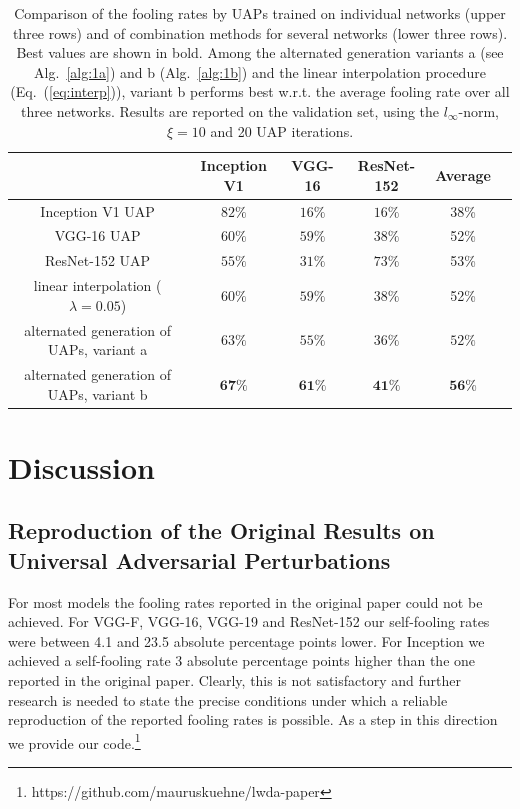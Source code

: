 \documentclass[runningheads]{llncs}
\begin{document}
\begin{table}
\centering

\begin{tabular}{|c|c|c|c|c|c|}
\hline
											&	Inception	V1&	VGG-16		&	ResNet-152	& Average	\\ \hline
Inception V1 UAP							&	\(82\%\)		&	\(16\%\)	&	\(16\%\)	&38\%	\\
VGG-16 UAP								&	\(60\%\)		&	\(59\%\)	&	\(38\%\)	&52\%	\\
ResNet-152 UAP &	\(55\%\)		&	\(31\%\)	&	\(73\%\)&53\%		\\ \hline
linear interpolation (\(\lambda=0.05\))	&	\(60\%\)		&	\(59\%\)	&	\(38\%\)	&52\%\\
alternated generation of UAPs, variant a&	\(63\%\)		&	\(55\%\)	&	\(36\%\)	& \(52\%\)	\\
alternated generation of UAPs, variant b&	\(\mathbf{67}\%\)		&	\(\mathbf{61}\%\)	&	\(\mathbf{41}\%\)		&\(\mathbf{56}\)\%\\


\hline 
\end{tabular}

\caption{Comparison of the fooling rates by UAPs trained on individual networks (upper three rows) and of combination methods for several networks (lower three rows). Best values are shown in bold. Among the alternated generation variants a (see Alg.~\ref{alg:1a}) and b (Alg.~\ref{alg:1b}) and the linear interpolation procedure (Eq.~(\ref{eq:interp})), variant b performs best w.r.t. the average fooling rate over all three networks. Results are reported on the validation set, using the $l_\infty$-norm, $\xi=10$ and 20 UAP iterations.}\label{tab:vergleich_comb}
\end{table}


\section{Discussion}
\subsection{Reproduction of the Original Results on Universal Adversarial Perturbations}
For most models the fooling rates reported in the original paper could not be achieved. For VGG-F, VGG-16, VGG-19 and ResNet-152 our  self-fooling rates were between 4.1 and 23.5 absolute percentage points lower. For Inception we achieved a self-fooling rate 3 absolute percentage points higher than the one reported in the original paper. Clearly, this is not satisfactory and further research is needed to state the precise conditions under which a reliable reproduction of the reported fooling rates is possible. As a step in this direction we provide our code.\footnote{https://github.com/mauruskuehne/lwda-paper}
\end{document}
